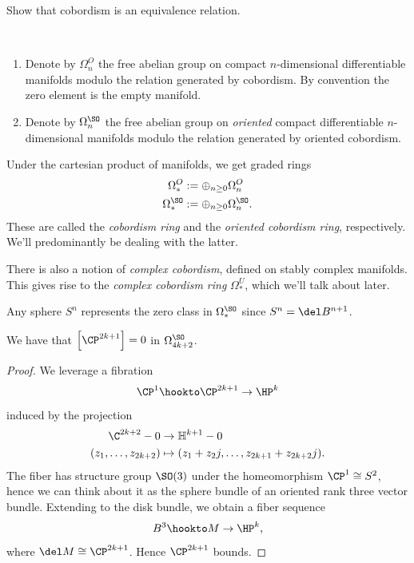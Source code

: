 \documentclass[11pt]{book}
\begin{document}
\begin{exercise} Show that cobordism is an equivalence relation.
\end{exercise}

\begin{definition}\label{def:cobordism-ring} \,
\begin{enumerate}
    \item Denote by $\Omega^O_n$ the free abelian group on compact $n$-dimensional differentiable manifolds modulo the relation generated by cobordism. By convention the zero element is the empty manifold.
    \item Denote by $\Omega^{\SO}_n$ the free abelian group on \emph{oriented} compact differentiable $n$-dimensional manifolds modulo the relation generated by oriented cobordism.
\end{enumerate}
\end{definition}

\begin{proposition} Under the cartesian product of manifolds, we get graded rings
\begin{align*}
    \Omega^O_\ast &:= \oplus_{n\ge0} \Omega^O_n \\
    \Omega^\SO_\ast &:= \oplus_{n\ge0} \Omega^\SO_n.
\end{align*}
These are called the \emph{cobordism ring} and the \emph{oriented cobordism ring}, respectively. We'll predominantly be dealing with the latter.
\end{proposition}


\begin{remark} There is also a notion of \emph{complex cobordism}, defined on stably complex manifolds. This gives rise to the \emph{complex cobordism ring} $\Omega^U_\ast$, which we'll talk about later.
\end{remark}

\begin{example} Any sphere $S^n$ represents the zero class in $\Omega^\SO_\ast$ since $S^n = \del B^{n+1}$.
\end{example}

\begin{proposition} We have that $\left[ \CP^{2k+1} \right]=0$ in $\Omega^{\SO}_{4k+2}$.
\end{proposition}
\begin{proof} We leverage a fibration
\begin{align*}
    \CP^1 \hookto \CP^{2k+1} \to \HP^k
\end{align*}
induced by the projection
\begin{align*}
    \C^{2k+2}-0 &\to \mathbb{H}^{k+1}-0 \\
    (z_1, \ldots, z_{2k+2}) &\mapsto (z_1 + z_2j, \ldots, z_{2k+1}+z_{2k+2}j).
\end{align*}
The fiber has structure group $\SO(3)$ under the homeomorphism $\CP^1 \cong S^2$, hence we can think about it as the sphere bundle of an oriented rank three vector bundle. Extending to the disk bundle, we obtain a fiber sequence
\begin{align*}
    B^3 \hookto M \to \HP^k,
\end{align*}
where $\del M \cong \CP^{2k+1}$. Hence $\CP^{2k+1}$ bounds.
\end{proof}
\end{document}
